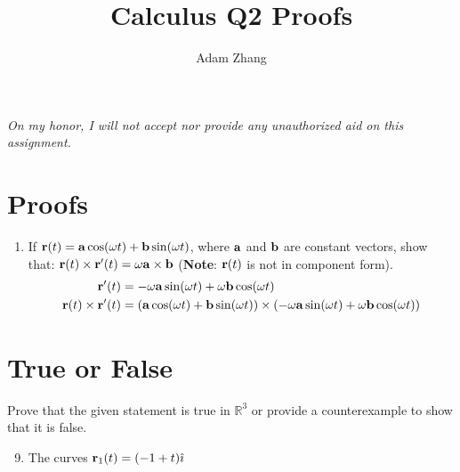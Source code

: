 \documentclass[11pt]{article}
\title{Calculus Q2 Proofs}
\author{Adam Zhang}
\renewcommand{\vec}[1]{\ensuremath\mathbf{#1}}
\begin{document}
\pagestyle{fancy}

\begin{center}
  \emph{On my honor, I will not accept nor provide any unauthorized aid on this assignment.}
\end{center}

\section*{Proofs}

\begin{enumerate}
\item If \(\vec{r}(t) = \vec{a}\cos(\omega t) + \vec{b}\sin(\omega t)\), where \(\vec{a}\) and \(\vec{b}\) are constant vectors, show that: \(\vec{r}(t) \times \vec{r} '(t) = \omega \vec{a} \times \vec{b}\) (\textbf{Note}: \(\vec{r}(t)\) is not in component form).
  \begin{align*}
    \vec{r}'(t) &= -\omega \vec{a}\sin(\omega t) + \omega \vec{b} \cos (\omega t) \\
    \vec{r}(t) \times \vec{r}'(t) &= \left( \vec{a} \cos(\omega t) + \vec{b} \sin(\omega t) \right) \times \left( -\omega \vec{a} \sin(\omega t) + \omega \vec{b} \cos(\omega t) \right) \\
  \end{align*}
\end{enumerate}

\newpage
\section*{True or False}
Prove that the given statement is true in \(\mathbb{R}^3\) or provide a counterexample to show that it is false.

\begin{enumerate}
  \setcounter{enumi}{8}
\item The curves \(\vec{r}_1(t) = (-1 + t)\hat{\imath}\)
\end{enumerate}
\end{document}
